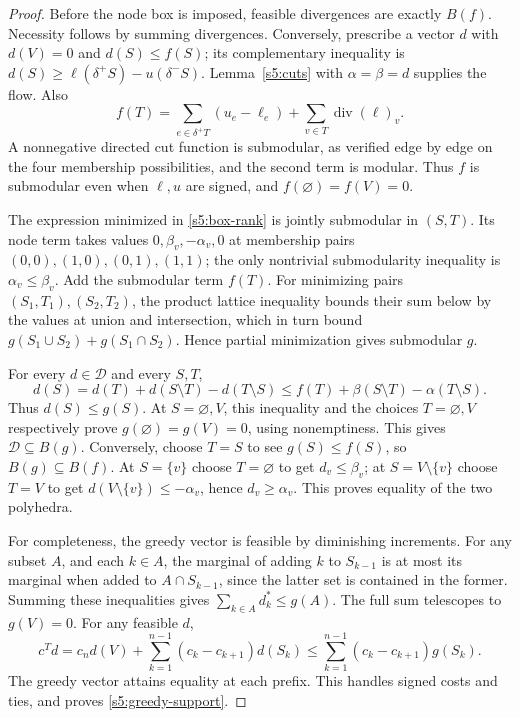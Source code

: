 \begin{proof}
Before the node box is imposed, feasible divergences are exactly $B(f)$.
Necessity follows by summing divergences. Conversely, prescribe a vector
$d$ with $d(V)=0$ and $d(S)\le f(S)$; its complementary inequality is
$d(S)\ge\ell(\delta^+S)-u(\delta^-S)$. Lemma~\ref{s5:cuts} with
$\alpha=\beta=d$ supplies the flow. Also
\[
 f(T)=\sum_{e\in\delta^+T}(u_e-\ell_e)
                         +\sum_{v\in T}\operatorname{div}(\ell)_v.
\]
A nonnegative directed cut function is submodular, as verified edge
by edge on the four membership possibilities, and the second term is
modular. Thus $f$ is submodular even when $\ell,u$ are signed, and
$f(\varnothing)=f(V)=0$.

The expression minimized in \eqref{s5:box-rank} is jointly submodular
in $(S,T)$. Its node term takes values $0,\beta_v,-\alpha_v,0$ at
membership pairs $(0,0),(1,0),(0,1),(1,1)$; the only nontrivial
submodularity inequality is $\alpha_v\le\beta_v$. Add the submodular
term $f(T)$. For minimizing pairs $(S_1,T_1),(S_2,T_2)$, the product
lattice inequality bounds their sum below by the values at union and
intersection, which in turn bound $g(S_1\cup S_2)+g(S_1\cap S_2)$.
Hence partial minimization gives submodular $g$.

For every $d\in\mathcal D$ and every $S,T$,
\[
 d(S)=d(T)+d(S\setminus T)-d(T\setminus S)
       \le f(T)+\beta(S\setminus T)-\alpha(T\setminus S).
\]
Thus $d(S)\le g(S)$. At $S=\varnothing,V$, this inequality and the
choices $T=\varnothing,V$ respectively prove
$g(\varnothing)=g(V)=0$, using nonemptiness. This gives
$\mathcal D\subseteq B(g)$. Conversely, choose $T=S$ to see
$g(S)\le f(S)$, so $B(g)\subseteq B(f)$. At $S=\{v\}$ choose
$T=\varnothing$ to get $d_v\le\beta_v$; at $S=V\setminus\{v\}$
choose $T=V$ to get $d(V\setminus\{v\})\le-\alpha_v$, hence
$d_v\ge\alpha_v$. This proves equality of the two polyhedra.

For completeness, the greedy vector is feasible by diminishing
increments. For any subset $A$, and each $k\in A$, the marginal of
adding $k$ to $S_{k-1}$ is at most its marginal when added to
$A\cap S_{k-1}$, since the latter set is contained in the former.
Summing these inequalities gives $\sum_{k\in A}d_k^*\le g(A)$.
The full sum telescopes to $g(V)=0$. For any feasible $d$,
\[
 c^Td=c_n d(V)+\sum_{k=1}^{n-1}(c_k-c_{k+1})d(S_k)
       \le\sum_{k=1}^{n-1}(c_k-c_{k+1})g(S_k).
\]
The greedy vector attains equality at each prefix. This handles signed
costs and ties, and proves \eqref{s5:greedy-support}.
\end{proof}

